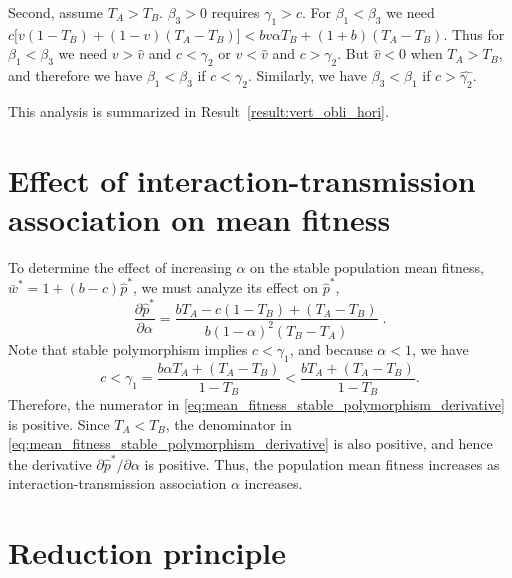 \documentclass[12pt]{extarticle}
\begin{document}
\begin{appendices}
Second, assume $T_A>T_B$.
$\beta_3>0$ requires $\gamma_1 > c$. 
For $\beta_1<\beta_3$ we need $c\big[v(1-T_B) + (1-v)(T_A-T_B)\big] < bv\alpha T_B + (1+b)(T_A-T_B)$.
Thus for $\beta_1<\beta_3$ we need $v > \hat v$ and $c < \gamma_2 $ or $v < \hat v$ and $c > \gamma_2$.
But $\hat{v}<0$ when $T_A > T_B$, and therefore we have $\beta_1<\beta_3$ if $c < \gamma_2$. Similarly, we have $\beta_3<\beta_1$ if $c > \hat{\gamma_2}$.

This analysis is summarized in Result~\ref{result:vert_obli_hori}.

\section{Effect of interaction-transmission association on mean fitness} \label{sec:appendixC}

To determine the effect of increasing $\alpha$ on the stable population mean fitness, $\bar{w}^*=1+(b-c)\hat{p}^*$, we must analyze its effect on $\hat{p}^*$, 
\begin{equation} \label{eq:mean_fitness_stable_polymorphism_derivative}
  \frac{\partial \hat{p}^*}{\partial \alpha} 
  = \frac{b T_A - c(1-T_B) + (T_A-T_B)}{b (1-\alpha)^2 (T_B-T_A)} \;.
\end{equation} 
Note that stable polymorphism implies $c<\gamma_1$, and because $\alpha<1$, we have
\begin{equation}
c < \gamma_1 = \frac{b \alpha T_A + (T_A-T_B)}{1-T_B} < \frac{b T_A + (T_A-T_B)}{1-T_B}.
\end{equation} 
Therefore, the numerator in \autoref{eq:mean_fitness_stable_polymorphism_derivative} is positive.
Since $T_A<T_B$, the denominator in \autoref{eq:mean_fitness_stable_polymorphism_derivative} is also positive, and hence the derivative $\partial \hat{p}^* / \partial \alpha$ is positive.
Thus, the population mean fitness increases as interaction-transmission association $\alpha$ increases.



\section{Reduction principle} \label{sec:appendixD}


\end{appendices}
\end{document}

